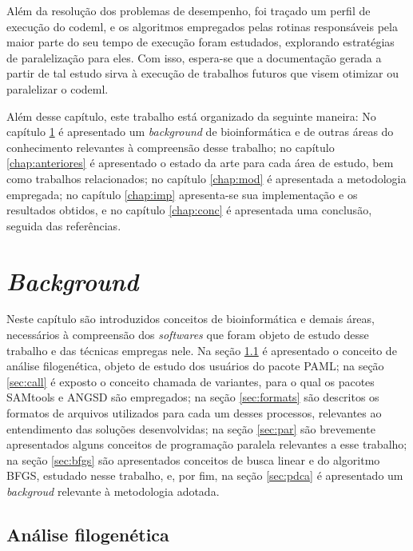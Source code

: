 \documentclass[cic,tc]{iiufrgs}
\begin{document}
Além da resolução dos problemas de desempenho, foi traçado um perfil de
execução do codeml, e os algoritmos empregados pelas rotinas responsáveis pela
maior parte do seu tempo de execução foram estudados, explorando estratégias de
paralelização para eles. Com isso, espera-se que a documentação gerada a partir
de tal estudo sirva à execução de trabalhos futuros que visem otimizar ou
paralelizar o codeml.

%
%
Além desse capítulo, este trabalho está organizado da seguinte maneira: No
capítulo \ref{chap:bg} é apresentado um \textit{background} de bioinformática e
de outras áreas do conhecimento relevantes à compreensão desse trabalho; no
capítulo \ref{chap:anteriores} é apresentado o estado da arte para cada área de
estudo, bem como trabalhos relacionados; no capítulo \ref{chap:mod} é
apresentada a metodologia empregada; no capítulo \ref{chap:imp} apresenta-se
sua implementação e os resultados obtidos, e no capítulo \ref{chap:conc} é
apresentada uma conclusão, seguida das referências.

%
%
%
%

\chapter{\textit{Background}}
\label{chap:bg}

Neste capítulo são introduzidos conceitos de bioinformática e demais áreas,
necessários à compreensão dos \textit{softwares} que foram objeto de estudo desse
trabalho e das técnicas empregas nele. Na seção \ref{sec:filo} é apresentado o
conceito de análise filogenética, objeto de estudo dos usuários do pacote PAML;
na seção \ref{sec:call} é exposto o conceito chamada de variantes, para o qual
os pacotes SAMtools e ANGSD são empregados; na seção \ref{sec:formats} são
descritos os formatos de arquivos utilizados para cada um desses processos,
relevantes ao entendimento das soluções desenvolvidas; na seção \ref{sec:par}
são brevemente apresentados alguns conceitos de programação paralela relevantes
a esse trabalho; na seção \ref{sec:bfgs} são apresentados conceitos de busca
linear e do algoritmo BFGS, estudado nesse trabalho, e, por fim, na seção
\ref{sec:pdca} é apresentado um \textit{backgroud} relevante à metodologia
adotada.


\section{Análise filogenética}
\label{sec:filo}
\end{document}
